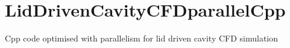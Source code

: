 \chapter{Lid\+Driven\+Cavity\+CFDparallel\+Cpp}
\hypertarget{md__r_e_a_d_m_e}{}\label{md__r_e_a_d_m_e}
\label{md__r_e_a_d_m_e_autotoc_md0}%
%
Cpp code optimised with parallelism for lid driven cavity CFD simulation 